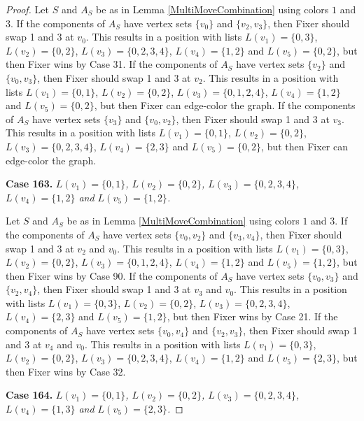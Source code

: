 \documentclass[12pt]{amsart}
\theoremstyle{plain}
\theoremstyle{definition}
\theoremstyle{remark}
\begin{document}
\begin{proof}
Let $S$ and $A_S$ be as in Lemma \ref{MultiMoveCombination} using colors $1$ and $3$. If the components of $A_S$ have vertex sets $\{v_0\}$ and $\{v_2, v_3\}$, then Fixer should swap 1 and 3 at $v_0$. This results in a position with lists $L(v_1) = \{0, 3\}$, $L(v_2) = \{0, 2\}$, $L(v_3) = \{0, 2, 3, 4\}$, $L(v_4) = \{1, 2\}$ and $L(v_5) = \{0, 2\}$, but then Fixer wins by Case 31. If the components of $A_S$ have vertex sets $\{v_2\}$ and $\{v_0, v_3\}$, then Fixer should swap 1 and 3 at $v_2$. This results in a position with lists $L(v_1) = \{0, 1\}$, $L(v_2) = \{0, 2\}$, $L(v_3) = \{0, 1, 2, 4\}$, $L(v_4) = \{1, 2\}$ and $L(v_5) = \{0, 2\}$, but then Fixer can edge-color the graph. If the components of $A_S$ have vertex sets $\{v_3\}$ and $\{v_0, v_2\}$, then Fixer should swap 1 and 3 at $v_3$. This results in a position with lists $L(v_1) = \{0, 1\}$, $L(v_2) = \{0, 2\}$, $L(v_3) = \{0, 2, 3, 4\}$, $L(v_4) = \{2, 3\}$ and $L(v_5) = \{0, 2\}$, but then Fixer can edge-color the graph. 

\noindent\textbf{Case 163.  }\textit{$L(v_1) = \{0, 1\}$, $L(v_2) = \{0, 2\}$, $L(v_3) = \{0, 2, 3, 4\}$, $L(v_4) = \{1, 2\}$ and $L(v_5) = \{1, 2\}$.}

Let $S$ and $A_S$ be as in Lemma \ref{MultiMoveCombination} using colors $1$ and $3$. If the components of $A_S$ have vertex sets $\{v_0, v_2\}$ and $\{v_3, v_4\}$, then Fixer should swap 1 and 3 at $v_2$ and $v_0$. This results in a position with lists $L(v_1) = \{0, 3\}$, $L(v_2) = \{0, 2\}$, $L(v_3) = \{0, 1, 2, 4\}$, $L(v_4) = \{1, 2\}$ and $L(v_5) = \{1, 2\}$, but then Fixer wins by Case 90. If the components of $A_S$ have vertex sets $\{v_0, v_3\}$ and $\{v_2, v_4\}$, then Fixer should swap 1 and 3 at $v_3$ and $v_0$. This results in a position with lists $L(v_1) = \{0, 3\}$, $L(v_2) = \{0, 2\}$, $L(v_3) = \{0, 2, 3, 4\}$, $L(v_4) = \{2, 3\}$ and $L(v_5) = \{1, 2\}$, but then Fixer wins by Case 21. If the components of $A_S$ have vertex sets $\{v_0, v_4\}$ and $\{v_2, v_3\}$, then Fixer should swap 1 and 3 at $v_4$ and $v_0$. This results in a position with lists $L(v_1) = \{0, 3\}$, $L(v_2) = \{0, 2\}$, $L(v_3) = \{0, 2, 3, 4\}$, $L(v_4) = \{1, 2\}$ and $L(v_5) = \{2, 3\}$, but then Fixer wins by Case 32. 

\noindent\textbf{Case 164.  }\textit{$L(v_1) = \{0, 1\}$, $L(v_2) = \{0, 2\}$, $L(v_3) = \{0, 2, 3, 4\}$, $L(v_4) = \{1, 3\}$ and $L(v_5) = \{2, 3\}$.}


\end{proof}
\end{document}
